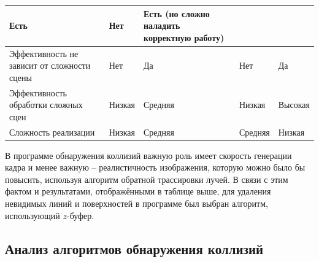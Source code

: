 \begin{adjustbox}{width=1\textwidth}
\begin{tabular}{|p{}|p{}|p{}|p{}|p{}|}
        \cellcolor{green!10}
        Есть 
        &
        \cellcolor{red!10}
        Нет
        &
        \cellcolor{yellow!10}
        Есть (но сложно наладить корректную работу)
        \\
        \hline
        Эффективность не зависит от сложности сцены
        &
        \cellcolor{red!10}
        Нет
        &
        \cellcolor{green!10}
        Да
        &
        \cellcolor{red!10}
        Нет
        &
        \cellcolor{green!10}
        Да
        \\
        \hline
        Эффективность обработки сложных сцен
        &
        \cellcolor{red!10}
        Низкая
        &
        \cellcolor{yellow!10}
        Средняя
        &
        \cellcolor{red!10}
        Низкая
        &
        \cellcolor{green!10}
        Высокая
        \\
        \hline
        Сложность реализации
        &
        \cellcolor{green!10}
        Низкая
        &
        \cellcolor{yellow!10}
        Средняя
        &
        \cellcolor{yellow!10}
        Средняя
        &
        \cellcolor{green!10}
        Низкая
        \\
        \hline
    \end{tabular}
\end{adjustbox}

\vspace{0.5cm}

В программе обнаружения коллизий важную роль имеет скорость генерации кадра и
менее важную -- реалистичность изображения, которую можно было бы повысить,
используя алгоритм обратной трассировки лучей. В связи с этим фактом и
результатами, отображёнными в таблице выше, для удаления невидимых линий и
поверхностей в программе был выбран алгоритм, использующий $z$-буфер.

\subsection{Анализ алгоритмов обнаружения коллизий}

